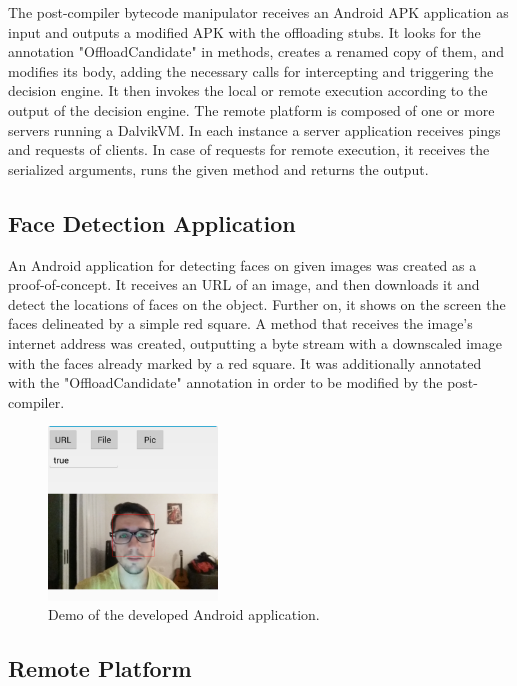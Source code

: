 \documentclass[10pt, conference, letterpaper]{IEEEtran}
\begin{document}
  The post-compiler bytecode manipulator receives an Android APK application as input and outputs a modified APK with the offloading stubs. It looks for the annotation "OffloadCandidate" in methods, creates a renamed copy of them, and modifies its body, adding the necessary calls for intercepting and triggering the decision engine. It then invokes the local or remote execution according to the output of the decision engine. The remote platform is composed of one or more servers running a DalvikVM. In each instance a server application receives pings and requests of clients. In case of requests for remote execution, it receives the serialized arguments, runs the given method and returns the output.

\subsection{Face Detection Application}
  
  An Android application for detecting faces on given images was created as a proof-of-concept. It receives an URL of an image, and then downloads it and detect the locations of faces on the object. Further on, it shows on the screen the faces delineated by a simple red square. A method that receives the image's internet address was created, outputting a byte stream with a downscaled image with the faces already marked by a red square. It was additionally annotated with the  "OffloadCandidate" annotation in order to be modified by the post-compiler.


\begin{figure}[!t]
  \centering
  \includegraphics[width=0.4\textwidth]{imgs/app.png}
  \caption{Demo of the developed Android application.}
  \label{fig:exectime}
\end{figure}


  \subsection{Remote Platform}
  
\end{document}
